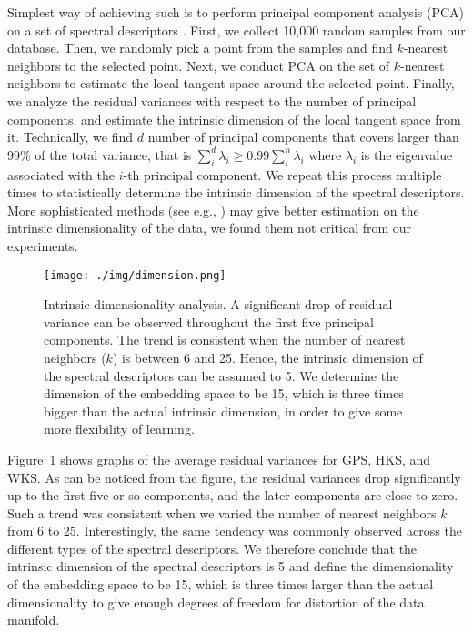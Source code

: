 \documentclass[5p,twocolumn,10pt,times]{elsarticle}
\begin{document}
Simplest way of achieving such is to perform principal component analysis (PCA) on a set of spectral descriptors \cite{kirby2000geometric,wold1987principal}. First, we collect 10,000 random samples from our database. Then, we randomly pick a point from the samples and find $k$-nearest neighbors to the selected point. Next, we conduct PCA on the set of $k$-nearest neighbors to estimate the local tangent space around the selected point. Finally, we analyze the residual variances with respect to the number of principal components, and estimate the intrinsic dimension of the local tangent space from it. Technically, we find $d$ number of principal components that covers larger than 99\% of the total variance, that is $\sum_{i}^{d} \lambda_i \ge 0.99\sum_{i}^{n} \lambda_i$ where $\lambda_i$ is the eigenvalue associated with the $i$-th principal component. We repeat this process multiple times to statistically determine the intrinsic dimension of the spectral descriptors. More sophisticated methods (see e.g., \cite{martin1979multivariate,tenenbaum2000global,roweis2000nonlinear}) may give better estimation on the intrinsic dimensionality of the data, we found them not critical from our experiments.


\begin{figure}
	\begin{center}
			\texttt{[image: ./img/dimension.png]}
	\end{center}
	\caption{Intrinsic dimensionality analysis. A significant drop of residual variance can be observed throughout the first five principal components. The trend is consistent when the number of nearest neighbors ($k$) is between 6 and 25. Hence, the intrinsic dimension of the spectral descriptors can be assumed to 5. We determine the dimension of the embedding space to be 15, which is three times bigger than the actual intrinsic dimension, in order to give some more flexibility of learning.}
	\label{fig:dimension}
\end{figure}

Figure~\ref{fig:dimension} shows graphs of the average residual variances for GPS, HKS, and WKS. As can be noticed from the figure, the residual variances drop significantly up to the first five or so components, and the later components are close to zero. Such a trend was consistent when we varied the number of nearest neighbors $k$ from 6 to 25. Interestingly, the same tendency was commonly observed across the different types of the spectral descriptors. We therefore conclude that the intrinsic dimension of the spectral descriptors is 5 and define the dimensionality of the embedding space to be 15, which is three times larger than the actual dimensionality to give enough degrees of freedom for distortion of the data manifold.
\end{document}
